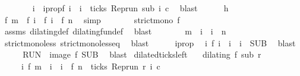 \begin{isabellebody}
\ \ \ \ \ \ \isamarkupfalse%
\ i\ \ i{}prop{\isacharcolon}{\isacartoucheopen}f\ i\ {\isacharequal}\ i\ {\isasymand}\ ticks\ {\isacharparenleft}{\isacharparenleft}Rep{\isacharunderscore}run\ sub{\isacharparenright}\ i\ c{\isacharparenright}{\isacartoucheclose}\ \isamarkupfalse%
\ blast\isanewline
\ \ \ \ \isamarkupfalse%
\ h\ \isamarkupfalse%
\ {\isacartoucheopen}f\ m\ {\isacharless}\ f\ i\ {\isasymand}\ f\ i\ {\isacharless}\ f\ n{\isacartoucheclose}\ \isamarkupfalse%
\ simp\isanewline
\ \ \ \ \isamarkupfalse%
\ \isamarkupfalse%
\ {\isacartoucheopen}strict{\isacharunderscore}mono\ f{\isacartoucheclose}\ \isamarkupfalse%
\ assms\ dilating{\isacharunderscore}def\ dilating{\isacharunderscore}fun{\isacharunderscore}def\ \isamarkupfalse%
\ blast\isanewline
\ \ \ \ \isamarkupfalse%
\ \isamarkupfalse%
\ {\isacartoucheopen}m\ {\isacharless}\ i\ {\isasymand}\ i\ {\isacharless}\ n{\isacartoucheclose}\isanewline
\ \ \ \ \ \ \isamarkupfalse%
\ strict{\isacharunderscore}mono{\isacharunderscore}less\ strict{\isacharunderscore}mono{\isacharunderscore}less{\isacharunderscore}eq\ \isamarkupfalse%
\ blast\isanewline
\ \ \ \ \isamarkupfalse%
\ i{}prop\ \isamarkupfalse%
\ {\isacartoucheopen}{\isasymexists}i\ f\ i\ {\isacharequal}\ i\ {\isasymand}\ i\ {\isasymin}\ {\isacharquery}SUB{\isacartoucheclose}\ \isamarkupfalse%
\ blast\isanewline
\ \ \isacommand{{\isacharbraceright}}\isamarkupfalse%
\ \isamarkupfalse%
\ {\isacartoucheopen}{\isacharquery}RUN\ {\isasymsubseteq}\ image\ f\ {\isacharquery}SUB{\isacartoucheclose}\ \isamarkupfalse%
\ blast\isanewline
{}\isamarkupfalse%
%
\endisatagproof
{\isafoldproof}%
%
\isadelimproof
\isanewline
%
\endisadelimproof
\isanewline
{}\isamarkupfalse%
\ dilated{\isacharunderscore}ticks{\isacharunderscore}left{\isacharcolon}\isanewline
\ \ \ {\isacartoucheopen}dilating\ f\ sub\ r{\isacartoucheclose}\isanewline
\ \ \ \ \ {\isacartoucheopen}{\isacharbraceleft}i{\isachardot}\ f\ m\ {\isasymle}\ i\ {\isasymand}\ i\ {\isacharless}\ f\ n\ {\isasymand}\ ticks\ {\isacharparenleft}{\isacharparenleft}Rep{\isacharunderscore}run\ r{\isacharparenright}\ i\ c{\isacharparenright}{\isacharbraceright}\isanewline

\end{isabellebody}

